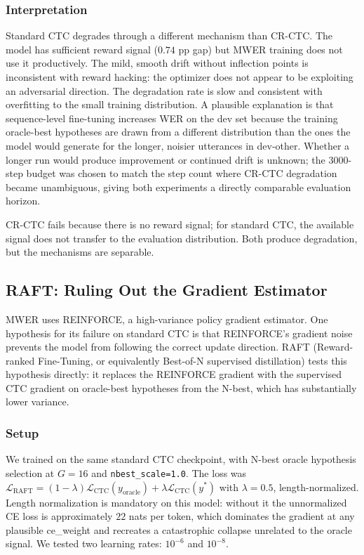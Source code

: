 \subsubsection{Interpretation}

Standard CTC degrades through a different mechanism than CR-CTC. The model has sufficient reward signal ($0.74$ pp gap) but MWER training does not use it productively. The mild, smooth drift without inflection points is inconsistent with reward hacking: the optimizer does not appear to be exploiting an adversarial direction. The degradation rate is slow and consistent with overfitting to the small training distribution. A plausible explanation is that sequence-level fine-tuning increases WER on the dev set because the training oracle-best hypotheses are drawn from a different distribution than the ones the model would generate for the longer, noisier utterances in dev-other. Whether a longer run would produce improvement or continued drift is unknown; the 3000-step budget was chosen to match the step count where CR-CTC degradation became unambiguous, giving both experiments a directly comparable evaluation horizon.

CR-CTC fails because there is no reward signal; for standard CTC, the available signal does not transfer to the evaluation distribution. Both produce degradation, but the mechanisms are separable.



\subsection{RAFT: Ruling Out the Gradient Estimator}

MWER uses REINFORCE, a high-variance policy gradient estimator. One hypothesis for its failure on standard CTC is that REINFORCE's gradient noise prevents the model from following the correct update direction. RAFT (Reward-ranked Fine-Tuning, or equivalently Best-of-N supervised distillation) tests this hypothesis directly: it replaces the REINFORCE gradient with the supervised CTC gradient on oracle-best hypotheses from the N-best, which has substantially lower variance.

\subsubsection{Setup}

We trained on the same standard CTC checkpoint, with N-best oracle hypothesis selection at $G=16$ and \texttt{nbest\_scale=1.0}. The loss was $\mathcal{L}_\text{RAFT} = (1-\lambda)\mathcal{L}_\text{CTC}(y_\text{oracle}) + \lambda \mathcal{L}_\text{CTC}(y^*)$ with $\lambda=0.5$, length-normalized. Length normalization is mandatory on this model: without it the unnormalized CE loss is approximately $22$ nats per token, which dominates the gradient at any plausible ce\_weight and recreates a catastrophic collapse unrelated to the oracle signal. We tested two learning rates: $10^{-6}$ and $10^{-8}$.

